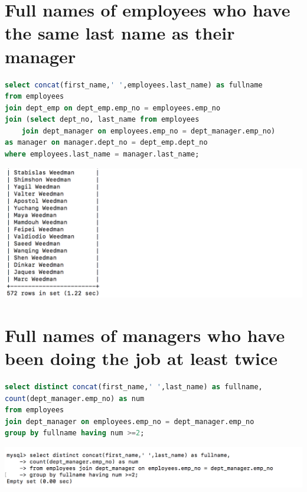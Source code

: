 \documentclass{article}
\begin{document}
\section{Full names of employees who have the same last name as their manager}
\begin{lstlisting}[language=sql]
select concat(first_name,' ',employees.last_name) as fullname
from employees 
join dept_emp on dept_emp.emp_no = employees.emp_no
join (select dept_no, last_name from employees 
    join dept_manager on employees.emp_no = dept_manager.emp_no) 
as manager on manager.dept_no = dept_emp.dept_no
where employees.last_name = manager.last_name;
\end{lstlisting}
\includegraphics[width=\linewidth]{out8.png}

\section{Full names of managers who have been doing the job at least twice}
\begin{lstlisting}[language=sql]
select distinct concat(first_name,' ',last_name) as fullname, 
count(dept_manager.emp_no) as num
from employees 
join dept_manager on employees.emp_no = dept_manager.emp_no 
group by fullname having num >=2;
\end{lstlisting}
\includegraphics[width=\linewidth]{out9.png}
\end{document}
